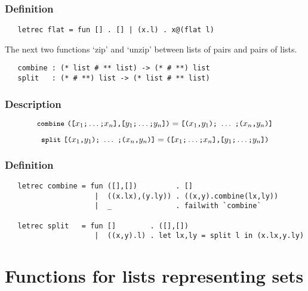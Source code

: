 \subsubsection*{Definition}

\begin{hol}\begin{verbatim}
   letrec flat = fun [] . [] | (x.l) . x@(flat l)
\end{verbatim}\end{hol}


\noindent The next two functions `zip' and `unzip' between lists of pairs
and pairs of lists.

\begin{boxed}
\begin{verbatim}
   combine : (* list # ** list) -> (* # **) list
   split   : (* # **) list -> (* list # ** list)
\end{verbatim}\end{boxed}

\subsubsection*{Description}

\[ \ml{combine}\
\ml{([}x_1\ml{;}\ldots\ml{;}x_n\ml{],[}y_1\ml{;}\ldots\ml{;}y_n\ml{])} = 
\ml{[(}x_1\ml{,}y_1\ml{);}\ \ldots\ \ml{;(}x_n\ml{,}y_n\ml{)]} \]

\[ \ml{split}\
\ml{[(}x_1\ml{,}y_1\ml{);}\ \ldots\ \ml{;(}x_n\ml{,}y_n\ml{)]} =
\ml{([}x_1\ml{;}\ldots\ml{;}x_n\ml{],[}y_1\ml{;}\ldots\ml{;}y_n\ml{])} \]

\subsubsection*{Definition}

\begin{hol}\begin{verbatim}
   letrec combine = fun ([],[])         . []
                     |  ((x.lx),(y.ly)) . ((x,y).combine(lx,ly))
                     |  _               . failwith `combine`

   letrec split   = fun []        . ([],[])
                     |  ((x,y).l) . let lx,ly = split l in (x.lx,y.ly)
\end{verbatim}\end{hol}


\section{Functions for lists representing sets}

